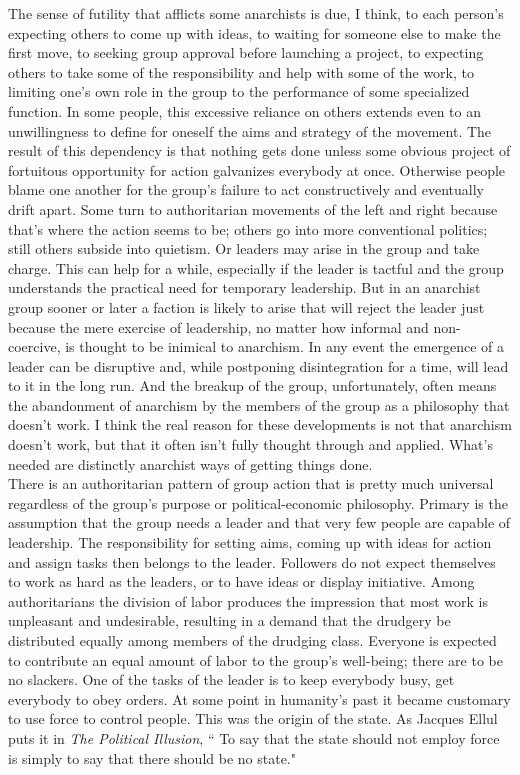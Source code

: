 The sense of futility that afflicts some anarchists is due, I think, to each person's expecting others to come up with ideas, to waiting for someone else to make the first move, to seeking group approval before launching a project, to expecting others to take some of the responsibility and help with some of the work, to limiting one's own role in the group to the performance of some specialized function. In some people, this excessive reliance on others extends even to an unwillingness to define for oneself the aims and strategy of the movement. The result of this dependency is that nothing gets done unless some obvious project of fortuitous opportunity for action galvanizes everybody at once. Otherwise people blame one another for the group's failure to act constructively and eventually drift apart. Some turn to authoritarian movements of the left and right because that's where the action seems to be; others go into more conventional politics; still others subside into quietism. Or leaders may arise in the group and take charge. This can help for a while, especially if the leader is tactful and the group understands the practical need for temporary leadership. But in an anarchist group sooner or later a faction is likely to arise that will reject the leader just because the mere exercise of leadership, no matter how informal and non-coercive, is thought to be inimical to anarchism. In any event the emergence of a leader can be disruptive and, while postponing disintegration for a time, will lead to it in the long run. And the breakup of the group, unfortunately, often means the abandonment of anarchism by the members of the group as a philosophy that doesn't work. I think the real reason for these developments is not that anarchism doesn't work, but that it often isn't fully thought through and applied. What's needed are distinctly anarchist ways of getting things done.\\
There is an authoritarian pattern of group action that is pretty much universal regardless of the group's purpose or political-economic philosophy. Primary is the assumption that the group needs a leader and that very few people are capable of leadership. The responsibility for setting aims, coming up with ideas for action and assign tasks then belongs to the leader. Followers do not expect themselves to work as hard as the leaders, or to have ideas or display initiative. Among authoritarians the division of labor produces the impression that most work is unpleasant and undesirable, resulting in a demand that the drudgery be distributed equally among members of the drudging class. Everyone is expected to contribute an equal amount of labor to the group's well-being; there are to be no slackers. One of the tasks of the leader is to keep everybody busy, get everybody to obey orders. At some point in humanity's past it became customary to use force to control people. This was the origin of the state. As Jacques Ellul puts it in \emph{The Political Illusion}, `` To say that the state should not employ force is simply to say that there should be no state."\\
